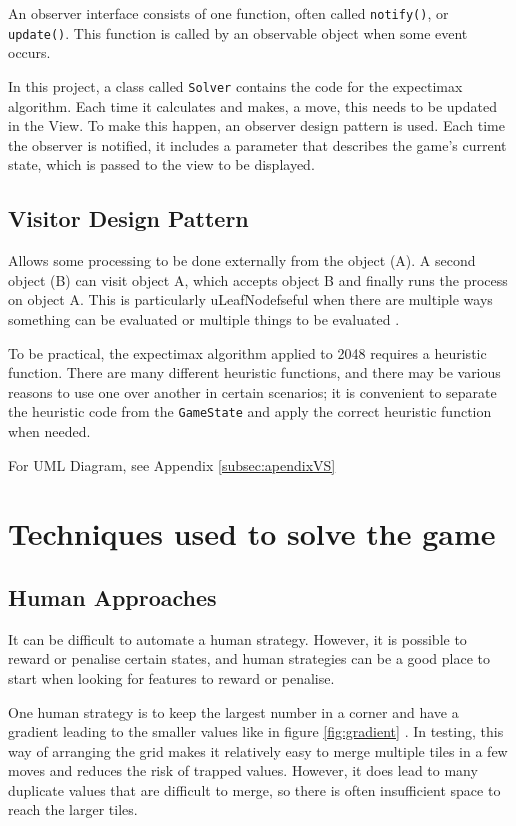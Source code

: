 \documentclass{article}
\begin{document}
An observer interface consists of one function, often called \texttt{notify()}, or \texttt{update()}. This function is called by an observable object when some event occurs.

In this project, a class called \texttt{Solver} contains the code for the expectimax algorithm. Each time it calculates and makes, a move, this needs to be updated in the View. To make
this happen, an observer design pattern is used. Each time the observer is notified, it includes a parameter that describes the game's current state, which is passed to the view to be displayed.
\subsection{Visitor Design Pattern}
\label{subsec:visitor}
Allows some processing to be done externally from the object (A). A second object (B) can visit object A, which accepts object B and finally runs the process on object A.  This is particularly uLeafNodefseful when there are multiple ways something can be evaluated or multiple things to be evaluated \cite{CS2800_behavioural}.

To be practical, the expectimax algorithm applied to 2048 requires a heuristic function. There are many different heuristic functions, and there may be various reasons to use one over another in certain scenarios; it is convenient to separate the heuristic code from the \texttt{GameState} and apply the correct heuristic function when needed.

For UML Diagram, see Appendix \ref{subsec:apendixVS}

\section{Techniques used to solve the game}
\label{sec:techniques}

\subsection{Human Approaches}
\label{subsec:human_techniques}
It can be difficult to automate a human strategy. However, it is possible to reward or penalise certain states, and human strategies can be a good place to start when looking for features to reward or penalise.

One human strategy is to keep the largest number in a corner and have a gradient leading to the smaller values like in figure \ref{fig:gradient} \cite{strategy2048}. In testing, this way of arranging the grid makes it relatively easy to merge multiple tiles in a few moves and reduces the risk of trapped values. However, it does lead to many duplicate values that are difficult to merge, so there is often insufficient space to reach the larger tiles.
\end{document}
